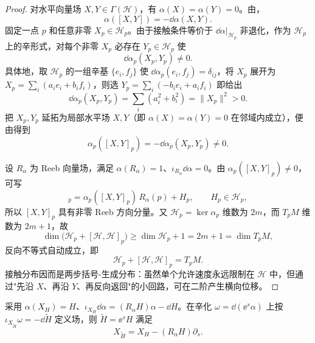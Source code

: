 \begin{proof}
对水平向量场 $X,Y\in\Gamma(\mathcal H)$，有 $\alpha(X)=\alpha(Y)=0$。由，
\begin{equation}
\alpha([X,Y])=-\dd\alpha(X,Y).
\label{eq:math-dg-contact-bracket-vertical}
\end{equation}
固定一点 $p$ 和任意非零 $X_p\in\mathcal H_p$。由于接触条件等价于 $\dd\alpha|_{\mathcal H_p}$ 非退化，作为 $\mathcal H_p$ 上的辛形式，对每个非零 $X_p$ 必存在 $Y_p\in\mathcal H_p$ 使
\begin{equation*}
\dd\alpha_p(X_p,Y_p)\neq0.
\end{equation*}
具体地，取 $\mathcal H_p$ 的一组辛基 $\{e_i,f_j\}$ 使 $\dd\alpha_p(e_i,f_j)=\delta_{ij}$，将 $X_p$ 展开为 $X_p=\sum_i(a_i e_i+b_i f_i)$，则选 $Y_p=\sum_i(-b_i e_i+a_i f_i)$ 即给出
\begin{equation*}
\dd\alpha_p(X_p,Y_p)=\sum_i(a_i^2+b_i^2)=\|X_p\|^2>0.
\end{equation*}
把 $X_p,Y_p$ 延拓为局部水平场 $X,Y$（即 $\alpha(X)=\alpha(Y)=0$ 在邻域内成立），便由得到
\begin{equation*}
\alpha_p([X,Y]_p)=-\dd\alpha_p(X_p,Y_p)\neq0.
\end{equation*}

设 $R_\alpha$ 为 Reeb 向量场，满足 $\alpha(R_\alpha)=1$、$\iota_{R_\alpha}\dd\alpha=0$。由 $\alpha_p([X,Y]_p)\neq0$，可写
\begin{equation*}
[X,Y]_p
=\alpha_p([X,Y]_p)\,R_\alpha(p)+H_p,
\qquad H_p\in\mathcal H_p,
\end{equation*}
所以 $[X,Y]_p$ 具有非零 Reeb 方向分量。又 $\mathcal H_p=\ker\alpha_p$ 维数为 $2m$，而 $T_pM$ 维数为 $2m+1$，故
\begin{equation*}
\dim\bigl(\mathcal H_p+[\mathcal H,\mathcal H]_p\bigr)
\ge\dim\mathcal H_p+1
=2m+1
=\dim T_pM,
\end{equation*}
反向不等式自动成立，即
\begin{equation}
{
\mathcal H_p+[\mathcal H,\mathcal H]_p=T_pM.
}
\label{eq:math-dg-contact-step-two-bracket-generating}
\end{equation}
接触分布因而是两步括号-生成分布：虽然单个允许速度永远限制在 $\mathcal H$ 中，但通过"先沿 $X$、再沿 $Y$、再反向返回"的小回路，可在二阶产生横向位移。
\end{proof}

\begin{proposition}
采用 $\alpha(X_H)=H$、$\iota_{X_H}\dd\alpha=(R_\alpha H)\alpha-\dd H$。在辛化 $\omega=\dd(\ee^s\alpha)$ 上按 $\iota_{X_{\widetilde H}}\omega=-\dd\widetilde H$ 定义场，则 $\widetilde H=\ee^sH$ 满足\[X_{\widetilde H}=X_H-(R_\alpha H)\partial_s.\]
\end{proposition}

